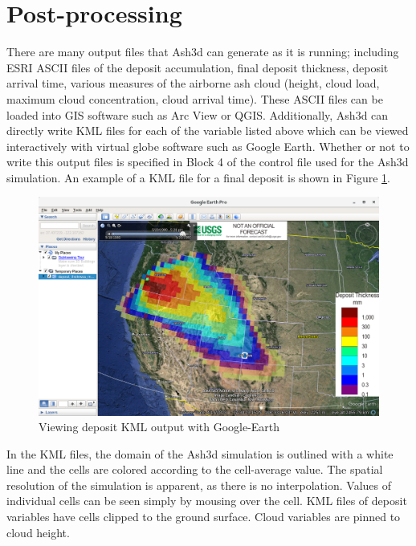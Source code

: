 \section{Post-processing}\label{ChapUsageSecPostProc}
There are many output files that Ash3d can generate as it is running; including
ESRI ASCII files of the deposit accumulation, final deposit thickness, deposit
arrival time, various
measures of the airborne ash cloud (height, cloud load, maximum cloud concentration,
cloud arrival time).  These ASCII files can be loaded into GIS software such
as Arc View or QGIS. Additionally, Ash3d can directly write KML files for each of
the variable listed above which can be viewed interactively with virtual globe
software such as Google Earth. Whether or not to write this output files is specified
in Block 4 of the control file used for the Ash3d simulation. An example of a KML
file for a final deposit is shown in Figure \ref{FigAsh3dOutputKMLDep}.

\begin{figure}[htbp]
\includegraphics[angle=0,scale=0.35]{Figures/Ash3dOutput_KMLDep_GoogleEarth.png}
\parbox{15cm}{\caption{\label{FigAsh3dOutputKMLDep}
Viewing deposit KML output with Google-Earth}}
\end{figure}

In the KML files, the domain of the Ash3d simulation is outlined with a white line
and the cells are colored according to the cell-average value. The spatial resolution of
the simulation is apparent, as there is no interpolation. Values of individual cells
can be seen simply by mousing over the cell. KML files of deposit variables have cells
clipped to the ground surface.  Cloud variables are pinned to cloud height.

